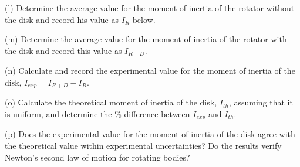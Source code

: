 (l) Determine the average value for the moment of inertia of the rotator without
the disk and record his value as \( I_{R} \) below.
\vspace{10mm}

(m) Determine the average value for the moment of inertia of the rotator with
the disk and record this value as \( I_{R+D} \).
\vspace{10mm}

(n) Calculate and record the experimental value for the moment of inertia of
the disk, \( I_{exp}  = I_{R+D} - I_{R} \).
\vspace{10mm}

(o) Calculate the theoretical moment of inertia of the disk, \( I_{th} \),
assuming that it is uniform, and determine the \% difference between \( I_{exp} \)
and \( I_{th} \).
\vspace{40mm}

(p) Does the experimental value for the moment of inertia of the disk agree
with the theoretical value within experimental uncertainties? Do the results
verify Newton's second law of motion for rotating bodies?

